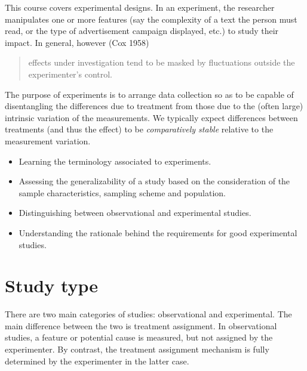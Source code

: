 \documentclass[
  11pt,
  letterpaper,
]{scrbook}
\providecommand{\tightlist}{%
  \setlength{\itemsep}{0pt}\setlength{\parskip}{0pt}}\usepackage{longtable,booktabs,array}
\theoremstyle{definition}
\theoremstyle{remark}
\begin{document}
This course covers experimental designs. In an experiment, the
researcher manipulates one or more features (say the complexity of a
text the person must read, or the type of advertisement campaign
displayed, etc.) to study their impact. In general, however (Cox 1958)

\begin{quote}
effects under investigation tend to be masked by fluctuations outside
the experimenter's control.
\end{quote}

The purpose of experiments is to arrange data collection so as to be
capable of disentangling the differences due to treatment from those due
to the (often large) intrinsic variation of the measurements. We
typically expect differences between treatments (and thus the effect) to
be \emph{comparatively stable} relative to the measurement variation.

\begin{tcolorbox}[enhanced jigsaw, title=\textcolor{quarto-callout-important-color}{\faExclamation}\hspace{0.5em}{\textbf{Learning objectives}:}, bottomtitle=1mm, opacitybacktitle=0.6, colframe=quarto-callout-important-color-frame, leftrule=.75mm, coltitle=black, colbacktitle=quarto-callout-important-color!10!white, colback=white, toprule=.15mm, rightrule=.15mm, breakable, bottomrule=.15mm, opacityback=0, toptitle=1mm, titlerule=0mm, arc=.35mm, left=2mm]

\begin{itemize}
\tightlist
\item
  Learning the terminology associated to experiments.
\item
  Assessing the generalizability of a study based on the consideration
  of the sample characteristics, sampling scheme and population.
\item
  Distinguishing between observational and experimental studies.
\item
  Understanding the rationale behind the requirements for good
  experimental studies.
\end{itemize}

\end{tcolorbox}

\hypertarget{study-type}{%
\section{Study type}\label{study-type}}

There are two main categories of studies: observational and
experimental. The main difference between the two is treatment
assignment. In observational studies, a feature or potential cause is
measured, but not assigned by the experimenter. By contrast, the
treatment assignment mechanism is fully determined by the experimenter
in the latter case.
\end{document}
